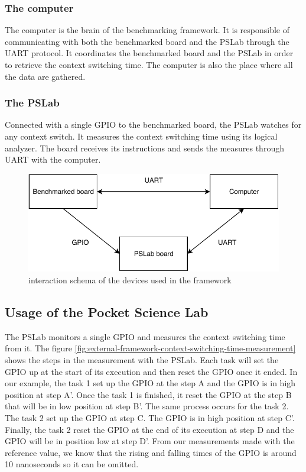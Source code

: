 \subsubsection{The computer}
The computer is the brain of the benchmarking framework.
It is responsible of communicating with both the benchmarked board and the PSLab through the UART protocol.
It coordinates the benchmarked board and the PSLab in order to retrieve the context switching time.
The computer is also the place where all the data are gathered.

\subsubsection{The PSLab}
Connected with a single GPIO to the benchmarked board, the PSLab watches for any context switch.
It measures the context switching time using its logical analyzer.
The board receives its instructions and sends the measures through UART with the computer.

\begin{figure}[!ht]
  \centering
  \includegraphics[scale=1]{assets/external-benchmarking-framework-schema.pdf}
  \caption{\label{fig:external-benchmarking-framework-schema}interaction schema of the devices used in the framework}
\end{figure}

\subsection{Usage of the Pocket Science Lab}

The PSLab monitors a single GPIO and measures the context switching time from it.
The figure \ref{fig:external-framework-context-switching-time-measurement} shows the steps in the measurement with the PSLab.
Each task will set the GPIO up at the start of its execution and then reset the GPIO once it ended.
In our example, the task 1 set up the GPIO at the step A and the GPIO is in high position at step A'.
Once the task 1 is finished, it reset the GPIO at the step B that will be in low position at step B'.
The same process occurs for the task 2.
The task 2 set up the GPIO at step C.
The GPIO is in high position at step C'.
Finally, the task 2 reset the GPIO at the end of its execution at step D and the GPIO will be in position low at step D'.
From our measurements made with the reference value, we know that the rising and falling times of the GPIO is around 10 nanoseconds so it can be omitted.

